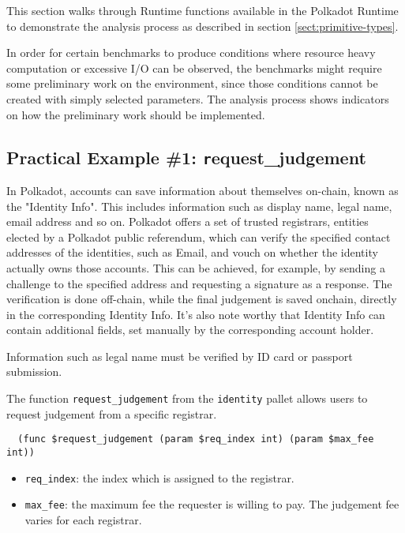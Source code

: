 \documentclass[11pt,a4paper]{article}
\begin{document}
This section walks through Runtime functions available in the Polkadot Runtime
to demonstrate the analysis process as described in section
\ref{sect:primitive-types}.
\newline

In order for certain benchmarks to produce conditions where resource heavy
computation or excessive I/O can be observed, the benchmarks might require some
preliminary work on the environment, since those conditions cannot be created
with simply selected parameters. The analysis process shows indicators on how
the preliminary work should be implemented.

\subsection{Practical Example \#1: {\texttt request\_judgement}}

In Polkadot, accounts can save information about themselves on-chain, known as
the "Identity Info". This includes information such as display name, legal name,
email address and so on. Polkadot offers a set of trusted registrars, entities
elected by a Polkadot public referendum, which can verify the specified contact
addresses of the identities, such as Email, and vouch on whether the identity
actually owns those accounts. This can be achieved, for example, by sending a
challenge to the specified address and requesting a signature as a response. The
verification is done off-chain, while the final judgement is saved onchain,
directly in the corresponding Identity Info. It's also note worthy that Identity
Info can contain additional fields, set manually by the corresponding account
holder.

Information such as legal name must be verified by ID card or passport
submission.
\newline

The function \verb|request_judgement| from the \verb|identity| pallet allows
users to request judgement from a specific registrar.

\begin{verbatim}
  (func $request_judgement (param $req_index int) (param $max_fee int))
\end{verbatim}

\begin{itemize}
  \item \verb|req_index|: the index which is assigned to the registrar.
  \item \verb|max_fee|: the maximum fee the requester is willing to pay. The
  judgement fee varies for each registrar.
\end{itemize}
\end{document}
